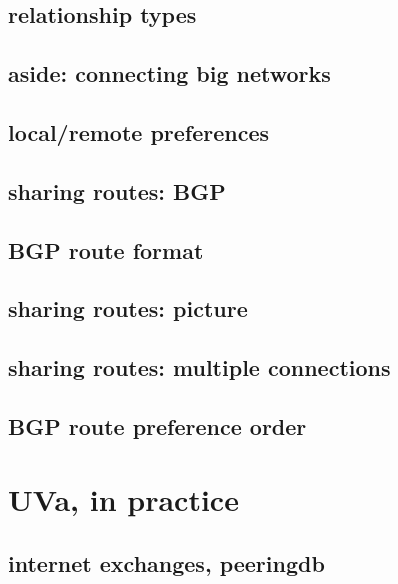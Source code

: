 \subsection{relationship types}


\subsection{aside: connecting big networks}


\subsection{local/remote preferences}


\subsection{sharing routes: BGP}


\subsection{BGP route format}


\subsection{sharing routes: picture}


\subsection{sharing routes: multiple connections}


\subsection{BGP route preference order}

\section{UVa, in practice}


\subsection{internet exchanges, peeringdb}



